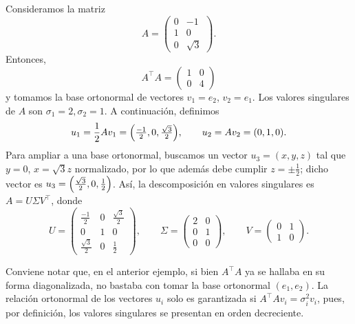 \begin{example}
	Consideramos la matriz
	\[
		A=
		\begin{pmatrix}
			0 & -1       \\
			1 & 0        \\
			0 & \sqrt{3}
		\end{pmatrix}.
	\]
	Entonces,
	\[
		A^{\top}A=
		\begin{pmatrix}
			1 & 0 \\
			0 & 4
		\end{pmatrix}
	\]
	y tomamos la base ortonormal de vectores $v_1=e_2$, $v_2=e_1$. Los valores singulares de $A$ son $\sigma_1=2, \sigma_2=1$. A continuación, definimos
	\[
		u_1=\frac{1}{2}Av_1=\parens*{\tfrac{-1}{2},0,\tfrac{\sqrt{3}}{2}}, \qquad
		u_2=Av_2=\parens*{0,1,0}.
	\]
	Para ampliar a una base ortonormal, buscamos un vector $u_3=(x,y,z)$ tal que $y=0$, $x=\sqrt{3}z$ normalizado, por lo que además debe cumplir $z=\pm\tfrac{1}{2}$; dicho vector es $u_3=\parens*{\tfrac{\sqrt{3}}{2},0,\tfrac{1}{2}}$.
	Así, la descomposición en valores singulares es $A=U\Sigma V^{\top}$, donde
	\[
		U=
		\begin{pmatrix}
			\frac{-1}{2}       & 0 & \frac{\sqrt{3}}{2} \\
			0                  & 1 & 0                  \\
			\frac{\sqrt{3}}{2} & 0 & \frac{1}{2}
		\end{pmatrix},
		\qquad
		\Sigma=
		\begin{pmatrix}
			2 & 0 \\
			0 & 1 \\
			0 & 0
		\end{pmatrix},
		\qquad
		V=
		\begin{pmatrix}
			0 & 1 \\
			1 & 0
		\end{pmatrix}.
	\]
\end{example}

\begin{informal}
	Conviene notar que, en el anterior ejemplo, si bien $A^\top A$ ya se hallaba en su forma diagonalizada, no bastaba con tomar la base ortonormal $(e_1,e_2)$. La relación ortonormal de los vectores $u_i$ solo es garantizada si $A^\top Av_i=\sigma_i^2 v_i$, pues, por definición, los valores singulares se presentan en orden decreciente.
\end{informal}
